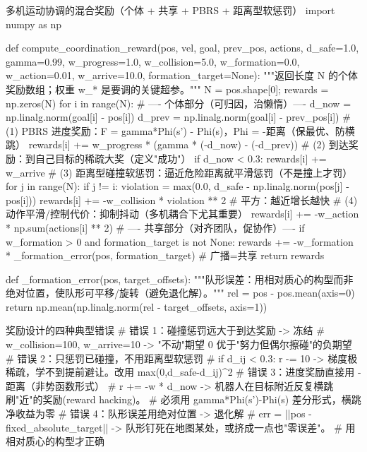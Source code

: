 \begin{codebox}[Python]{多机运动协调的混合奖励（个体 + 共享 + PBRS + 距离型软惩罚）}
import numpy as np

def compute_coordination_reward(pos, vel, goal, prev_pos, actions,
                                d_safe=1.0, gamma=0.99,
                                w_progress=1.0, w_collision=5.0, w_formation=0.0,
                                w_action=0.01, w_arrive=10.0, formation_target=None):
    """返回长度 N 的个体奖励数组；权重 w_* 是要调的关键超参。"""
    N = pos.shape[0]; rewards = np.zeros(N)
    for i in range(N):
        # ---- 个体部分（可归因，治懒惰）----
        d_now  = np.linalg.norm(goal[i] - pos[i])
        d_prev = np.linalg.norm(goal[i] - prev_pos[i])
        # (1) PBRS 进度奖励：F = gamma*Phi(s') - Phi(s)，Phi = -距离（保最优、防横跳）
        rewards[i] += w_progress * (gamma * (-d_now) - (-d_prev))
        # (2) 到达奖励：到自己目标的稀疏大奖（定义"成功"）
        if d_now < 0.3:
            rewards[i] += w_arrive
        # (3) 距离型碰撞软惩罚：逼近危险距离就平滑惩罚（不是撞上才罚）
        for j in range(N):
            if j != i:
                violation = max(0.0, d_safe - np.linalg.norm(pos[j] - pos[i]))
                rewards[i] += -w_collision * violation ** 2   # 平方：越近增长越快
        # (4) 动作平滑/控制代价：抑制抖动（多机耦合下尤其重要）
        rewards[i] += -w_action * np.sum(actions[i] ** 2)
    # ---- 共享部分（对齐团队，促协作）----
    if w_formation > 0 and formation_target is not None:
        rewards += -w_formation * _formation_error(pos, formation_target)  # 广播=共享
    return rewards

def _formation_error(pos, target_offsets):
    """队形误差：用相对质心的构型而非绝对位置，使队形可平移/旋转（避免退化解）。"""
    rel = pos - pos.mean(axis=0)
    return np.mean(np.linalg.norm(rel - target_offsets, axis=1))
\end{codebox}

\begin{codebox}[Python]{奖励设计的四种典型错误}
# 错误 1：碰撞惩罚远大于到达奖励 -> 冻结
#   w_collision=100, w_arrive=10 -> "不动"期望 0 优于"努力但偶尔擦碰"的负期望
# 错误 2：只惩罚已碰撞，不用距离型软惩罚
#   if d_ij < 0.3: r -= 10  -> 梯度极稀疏，学不到提前避让。改用 max(0,d_safe-d_ij)^2
# 错误 3：进度奖励直接用 -距离（非势函数形式）
#   r += -w * d_now  -> 机器人在目标附近反复横跳刷"近"的奖励(reward hacking)。
#                       必须用 gamma*Phi(s')-Phi(s) 差分形式，横跳净收益为零
# 错误 4：队形误差用绝对位置 -> 退化解
#   err = ||pos - fixed_absolute_target||  -> 队形钉死在地图某处，或挤成一点也"零误差"。
#                                              用相对质心的构型才正确
\end{codebox}

